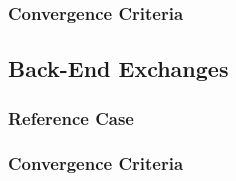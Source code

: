 
\subsubsection{Convergence Criteria}

\subsection{Back-End Exchanges}

\subsubsection{Reference Case}




\subsubsection{Convergence Criteria}
